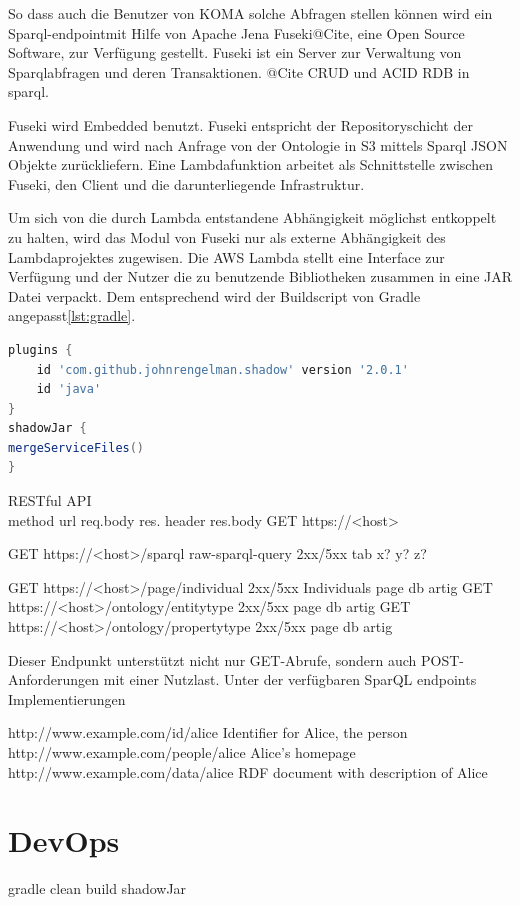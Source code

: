 \documentclass[
12pt,
english,
ngerman,
headsepline,
twoside,
openright,
numbers=noenddot,version=first
]{scrreprt}
\begin{document}
So dass auch die Benutzer von KOMA solche Abfragen stellen können wird ein \glqq Sparql-endpoint\grqq mit Hilfe von Apache Jena Fuseki@Cite, eine Open Source Software, zur Verfügung gestellt. Fuseki ist ein Server zur Verwaltung von Sparqlabfragen und deren Transaktionen. @Cite CRUD und ACID RDB in sparql.


Fuseki wird Embedded benutzt.
Fuseki entspricht der Repositoryschicht der Anwendung und wird nach Anfrage von der Ontologie in S3 mittels Sparql JSON Objekte zurückliefern.
Eine Lambdafunktion arbeitet als Schnittstelle zwischen Fuseki, den Client und die darunterliegende Infrastruktur.

Um sich von die durch Lambda entstandene Abhängigkeit möglichst entkoppelt\cite{FlowerRefactoring} zu halten, wird das Modul von Fuseki nur als externe Abhängigkeit des Lambdaprojektes zugewisen.
Die AWS Lambda stellt eine Interface zur Verfügung und der Nutzer die zu benutzende Bibliotheken zusammen in eine JAR Datei verpackt. Dem entsprechend wird der Buildscript von Gradle\cite{Muschko2014} angepasst\autoref{lst:gradle}. 

\begin{lstlisting}[language=Groovy,caption={Abhängigkeitenverwaltung für Lambda in Java},label={lst:gradle}]
plugins {
	id 'com.github.johnrengelman.shadow' version '2.0.1'
	id 'java'
}
shadowJar {
mergeServiceFiles()
}

\end{lstlisting}


RESTful API \\
method url req.body res. header res.body
GET https://<host>

GET https://<host>/sparql raw-sparql-query 2xx/5xx tab x? y? z?

GET https://<host>/page/individual 2xx/5xx Individuals page db artig\cite{Hunter2017}
GET https://<host>/ontology/entitytype 2xx/5xx page db artig
GET https://<host>/ontology/propertytype 2xx/5xx page db artig

Dieser Endpunkt unterstützt nicht nur GET-Abrufe, sondern auch POST-Anforderungen mit einer Nutzlast.
Unter der verfügbaren SparQL endpoints Implementierungen


http://www.example.com/id/alice
Identifier for Alice, the person
http://www.example.com/people/alice
Alice's homepage
http://www.example.com/data/alice
RDF document with description of Alice

\section{DevOps}
gradle clean build shadowJar
\end{document}
